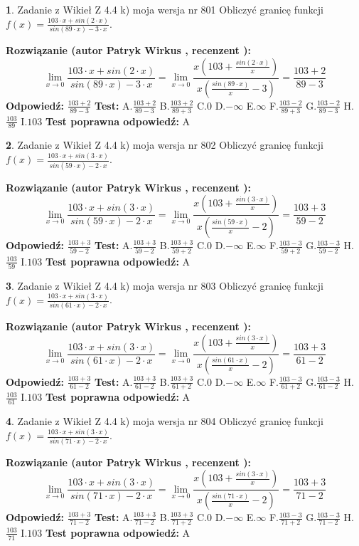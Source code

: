 \documentclass[12pt, a4paper]{article}
\theoremstyle{definition} %
\newtheorem{zad}{}
\newcommand{\zadStart}[1]{\begin{zad}#1\newline}
\newcommand{\zadStop}{\end{zad}}
\newcommand{\rozwStart}[2]{\noindent \textbf{Rozwiązanie (autor #1 , recenzent #2): }\newline}
\newcommand{\rozwStop}{\newline}
\newcommand{\odpStart}{\noindent \textbf{Odpowiedź:}\newline}
\newcommand{\odpStop}{\newline}
\newcommand{\testStart}{\noindent \textbf{Test:}\newline}
\newcommand{\testStop}{\newline}
\newcommand{\kluczStart}{\noindent \textbf{Test poprawna odpowiedź:}\newline}
\newcommand{\kluczStop}{\newline}
\begin{document}
\zadStart{Zadanie z Wikieł Z 4.4 k) moja wersja nr 801}
Obliczyć granicę funkcji $f(x)=\frac{103\cdot x +sin(2\cdot x)}{sin(89\cdot x) -3\cdot x}$.
\zadStop
\rozwStart{Patryk Wirkus}{}
$$\lim\limits_{x\to 0}\frac{103\cdot x +sin(2\cdot x)}{sin(89\cdot x) -3\cdot x}
=\lim\limits_{x\to 0}\frac{x(103+\frac{sin(2\cdot x)}{x})}{x(\frac{sin(89\cdot x)}{x}-3)}
=\frac{103+2}{89-3}$$
\rozwStop
\odpStart
$\frac{103+2}{89-3}$
\odpStop
\testStart
A.$\frac{103+2}{89-3}$
B.$\frac{103+2}{89+3}$
C.$0$
D.$-\infty$
E.$\infty$
F.$\frac{103-2}{89+3}$
G.$\frac{103-2}{89-3}$
H.$\frac{103}{89}$
I.$103$
\testStop
\kluczStart
A
\kluczStop



\zadStart{Zadanie z Wikieł Z 4.4 k) moja wersja nr 802}
Obliczyć granicę funkcji $f(x)=\frac{103\cdot x +sin(3\cdot x)}{sin(59\cdot x) -2\cdot x}$.
\zadStop
\rozwStart{Patryk Wirkus}{}
$$\lim\limits_{x\to 0}\frac{103\cdot x +sin(3\cdot x)}{sin(59\cdot x) -2\cdot x}
=\lim\limits_{x\to 0}\frac{x(103+\frac{sin(3\cdot x)}{x})}{x(\frac{sin(59\cdot x)}{x}-2)}
=\frac{103+3}{59-2}$$
\rozwStop
\odpStart
$\frac{103+3}{59-2}$
\odpStop
\testStart
A.$\frac{103+3}{59-2}$
B.$\frac{103+3}{59+2}$
C.$0$
D.$-\infty$
E.$\infty$
F.$\frac{103-3}{59+2}$
G.$\frac{103-3}{59-2}$
H.$\frac{103}{59}$
I.$103$
\testStop
\kluczStart
A
\kluczStop



\zadStart{Zadanie z Wikieł Z 4.4 k) moja wersja nr 803}
Obliczyć granicę funkcji $f(x)=\frac{103\cdot x +sin(3\cdot x)}{sin(61\cdot x) -2\cdot x}$.
\zadStop
\rozwStart{Patryk Wirkus}{}
$$\lim\limits_{x\to 0}\frac{103\cdot x +sin(3\cdot x)}{sin(61\cdot x) -2\cdot x}
=\lim\limits_{x\to 0}\frac{x(103+\frac{sin(3\cdot x)}{x})}{x(\frac{sin(61\cdot x)}{x}-2)}
=\frac{103+3}{61-2}$$
\rozwStop
\odpStart
$\frac{103+3}{61-2}$
\odpStop
\testStart
A.$\frac{103+3}{61-2}$
B.$\frac{103+3}{61+2}$
C.$0$
D.$-\infty$
E.$\infty$
F.$\frac{103-3}{61+2}$
G.$\frac{103-3}{61-2}$
H.$\frac{103}{61}$
I.$103$
\testStop
\kluczStart
A
\kluczStop



\zadStart{Zadanie z Wikieł Z 4.4 k) moja wersja nr 804}
Obliczyć granicę funkcji $f(x)=\frac{103\cdot x +sin(3\cdot x)}{sin(71\cdot x) -2\cdot x}$.
\zadStop
\rozwStart{Patryk Wirkus}{}
$$\lim\limits_{x\to 0}\frac{103\cdot x +sin(3\cdot x)}{sin(71\cdot x) -2\cdot x}
=\lim\limits_{x\to 0}\frac{x(103+\frac{sin(3\cdot x)}{x})}{x(\frac{sin(71\cdot x)}{x}-2)}
=\frac{103+3}{71-2}$$
\rozwStop
\odpStart
$\frac{103+3}{71-2}$
\odpStop
\testStart
A.$\frac{103+3}{71-2}$
B.$\frac{103+3}{71+2}$
C.$0$
D.$-\infty$
E.$\infty$
F.$\frac{103-3}{71+2}$
G.$\frac{103-3}{71-2}$
H.$\frac{103}{71}$
I.$103$
\testStop
\kluczStart
A
\kluczStop
\end{document}
